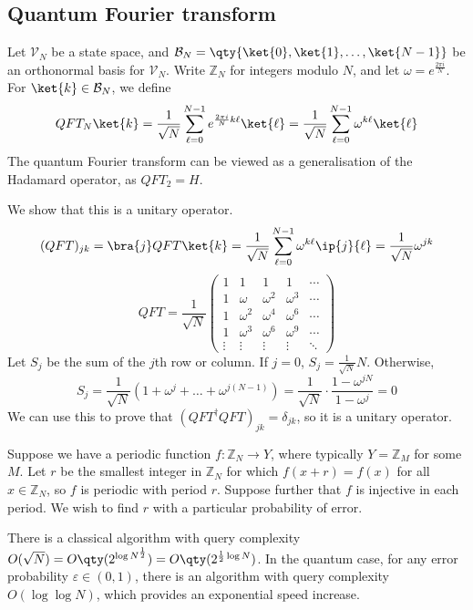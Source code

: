 \subsection{Quantum Fourier transform}
Let $\mathcal V_N$ be a state space, and $\mathcal B_N = \qty{\ket{0}, \ket{1}, \dots, \ket{N-1}}$ be an orthonormal basis for $\mathcal V_N$.
Write $\mathbb Z_N$ for integers modulo $N$, and let $\omega = e^{\frac{2\pi i}{N}}$.
For $\ket{k} \in \mathcal B_N$, we define
\[ QFT_N\ket{k} = \frac{1}{\sqrt{N}} \sum_{\ell=0}^{N-1} e^{\frac{2\pi i}{N}k\ell} \ket{\ell} = \frac{1}{\sqrt{N}} \sum_{\ell=0}^{N-1} \omega^{k\ell} \ket{\ell} \]
The quantum Fourier transform can be viewed as a generalisation of the Hadamard operator, as $QFT_2 = H$.

We show that this is a unitary operator.
\[ (QFT)_{jk} = \bra{j}QFT\ket{k} = \frac{1}{\sqrt{N}} \sum_{\ell=0}^{N-1} \omega^{k\ell} \ip{j}{\ell} = \frac{1}{\sqrt{N}} \omega^{jk} \]
\[ QFT = \frac{1}{\sqrt{N}} \begin{pmatrix}
    1 & 1 & 1 & 1 & \cdots \\
    1 & \omega & \omega^2 & \omega^3 & \cdots \\
    1 & \omega^2 & \omega^4 & \omega^6 & \cdots \\
    1 & \omega^3 & \omega^6 & \omega^9 & \cdots \\
    \vdots & \vdots & \vdots & \vdots & \ddots
\end{pmatrix} \]
Let $S_j$ be the sum of the $j$th row or column.
If $j = 0$, $S_j = \frac{1}{\sqrt{N}} N$.
Otherwise,
\[ S_j = \frac{1}{\sqrt{N}} (1 + \omega^j + \dots + \omega^{j(N-1)}) = \frac{1}{\sqrt{N}} \cdot \frac{1 - \omega^{jN}}{1 - \omega^j} = 0 \]
We can use this to prove that $(QFT^\dagger QFT)_{jk} = \delta_{jk}$, so it is a unitary operator.

Suppose we have a periodic function $f \colon \mathbb Z_N \to Y$, where typically $Y = \mathbb Z_M$ for some $M$.
Let $r$ be the smallest integer in $\mathbb Z_N$ for which $f(x+r) = f(x)$ for all $x \in \mathbb Z_N$, so $f$ is periodic with period $r$.
Suppose further that $f$ is injective in each period.
We wish to find $r$ with a particular probability of error.

There is a classical algorithm with query complexity $O(\sqrt{N}) = O\qty(2^{\log N^{\frac{1}{2}}}) = O\qty(2^{\frac{1}{2} \log N})$.
In the quantum case, for any error probability $\varepsilon \in (0,1)$, there is an algorithm with query complexity $O(\log \log N)$, which provides an exponential speed increase.


